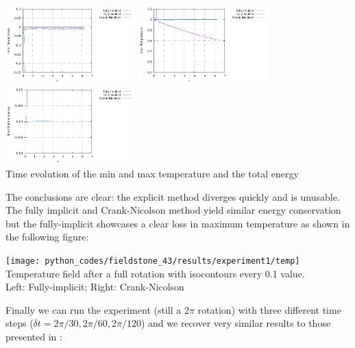 \begin{center}
\includegraphics[width=5cm]{python_codes/fieldstone_43/results/experiment1/Tmin.pdf}
\includegraphics[width=5cm]{python_codes/fieldstone_43/results/experiment1/Tmax.pdf}
\includegraphics[width=5cm]{python_codes/fieldstone_43/results/experiment1/ET.pdf}\\
{\small Time evolution of the min and max temperature and the total energy}
\end{center}
The conclusions are clear: the explicit method diverges quickly and is unusable. The fully implicit and Crank-Nicolson 
method yield similar energy conservation but the fully-implicit showcases a clear loss in maximum temperature as shown in the following figure:
\begin{center}
\texttt{[image: python\_codes/fieldstone\_43/results/experiment1/temp]}\\
{\small Temperature field after a full rotation with isocontours every 0.1 value.\\ Left: Fully-implicit; Right: Crank-Nicolson}
\end{center}

Finally we can run the experiment (still a $2\pi$ rotation) 
with three different time steps ($\delta t=2\pi/30,2\pi/60,2\pi/120$) 
and we recover very similar results to those presented in \cite{dohu03}:

